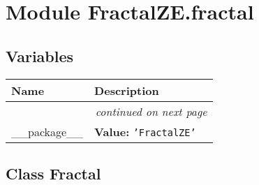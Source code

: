 %
%
%


\section{Module FractalZE.fractal}

    \label{FractalZE:fractal}


  \subsection{Variables}

    \vspace{-1cm}
\hspace{\varindent}\begin{longtable}{|p{\varnamewidth}|p{\vardescrwidth}|l}
\cline{1-2}
\cline{1-2} \centering \textbf{Name} & \centering \textbf{Description}& \\
\cline{1-2}
\endhead\cline{1-2}\multicolumn{3}{r}{\small\textit{continued on next page}}\\\endfoot\cline{1-2}
\endlastfoot\raggedright \_\-\_\-p\-a\-c\-k\-a\-g\-e\-\_\-\_\- & \raggedright \textbf{Value:} 
{\tt \texttt{'}\texttt{FractalZE}\texttt{'}}&\\
\cline{1-2}
\end{longtable}



\subsection{Class Fractal}

